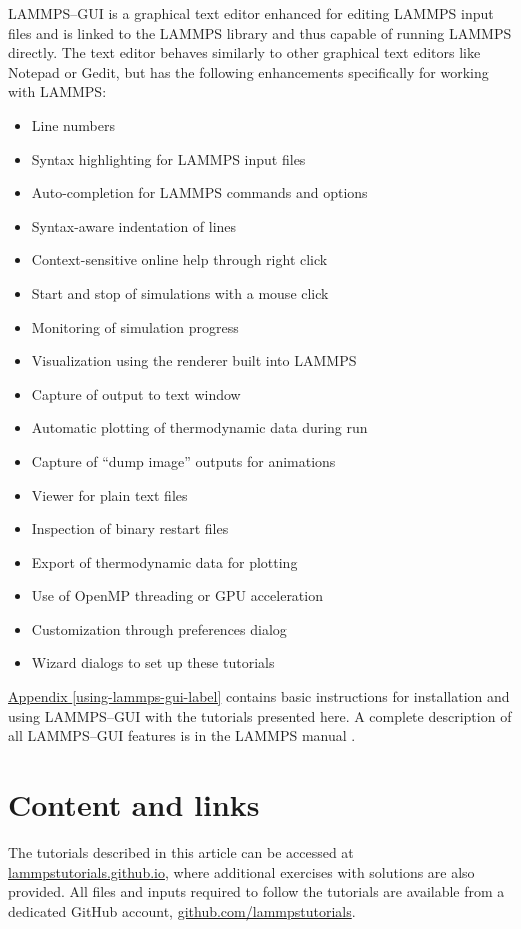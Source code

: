 \documentclass[9pt,tutorial]{livecoms}
\begin{document}
LAMMPS--GUI is a graphical text editor enhanced for editing LAMMPS input
files and is linked to the LAMMPS library and thus capable of running
LAMMPS directly.  The text editor behaves similarly to other graphical
text editors like Notepad or Gedit, but has the following enhancements
specifically for working with LAMMPS:
\begin{itemize}
\item Line numbers
\item Syntax highlighting for LAMMPS input files
\item Auto-completion for LAMMPS commands and options
\item Syntax-aware indentation of lines
\item Context-sensitive online help through right click
\item Start and stop of simulations with a mouse click
\item Monitoring of simulation progress
\item Visualization using the renderer built into LAMMPS
\item Capture of output to text window
\item Automatic plotting of thermodynamic data during run
\item Capture of ``dump image'' outputs for animations
\item Viewer for plain text files
\item Inspection of binary restart files
\item Export of thermodynamic data for plotting
\item Use of OpenMP threading or GPU acceleration
\item Customization through preferences dialog
\item Wizard dialogs to set up these tutorials
\end{itemize}

\hyperref[using-lammps-gui]{Appendix \ref{using-lammps-gui-label}}
contains basic instructions for installation and using LAMMPS--GUI with
the tutorials presented here.  A complete description of all LAMMPS--GUI
features is in the LAMMPS manual \cite{lammps_gui_docs}.

\section{Content and links}

The tutorials described in this article can be accessed at
\href{https://lammpstutorials.github.io}{lammpstutorials.github.io},
where additional exercises with solutions are also provided. All files
and inputs required to follow the tutorials are available from a
dedicated GitHub account,
\href{https://github.com/lammpstutorials}{github.com/lammpstutorials}.
\end{document}
